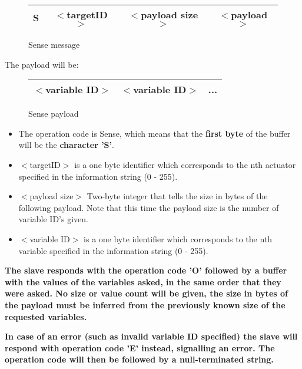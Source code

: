 \documentclass[11pt,a4paper,oneside]{book}
\begin{document}
\begin{figure}[h]
\centering
\label{fig:SenseRequest}
\begin{tabular}{|c|c|c|c|}
\hline 
S & $<$targetID$>$ & $<$payload size$>$ & $<$payload$>$ \\ 
\hline 
\end{tabular} 
\caption{Sense message}
\end{figure}

The payload will be:

\begin{figure}[h]
\centering
\label{fig:SensePayload}
\begin{tabular}{|c|c|c|}
\hline 
$<$variable ID$>$ & $<$variable ID$>$ & ... \\ 
\hline
\end{tabular} 
\caption{Sense payload}
\end{figure}

\begin{itemize}

\item The operation code is Sense, which means that the \textbf{first byte} of the buffer will be the\textbf{ character 'S'}.

\item $<$targetID$>$ is a one byte identifier which corresponds to the nth actuator specified in the information string (0 - 255).

\item $<$payload size$>$ Two-byte integer that tells the size in bytes of the following payload. Note that this time the payload size is the number of variable ID's given.

\item $<$variable ID$>$ is a one byte identifier which corresponds to the nth variable specified in the information string (0 - 255).

\end{itemize}

\textbf{The slave responds with the operation code 'O' followed by a buffer with the values of the variables asked, in the same order that they were asked. No size or value count will be given, the size in bytes of the payload must be inferred from the previously known size of the requested variables.}

\textbf{In case of an error (such as invalid variable ID specified) the slave will respond with operation code 'E' instead, signalling an error. The operation code will then be followed by a null-terminated string.}
\end{document}
